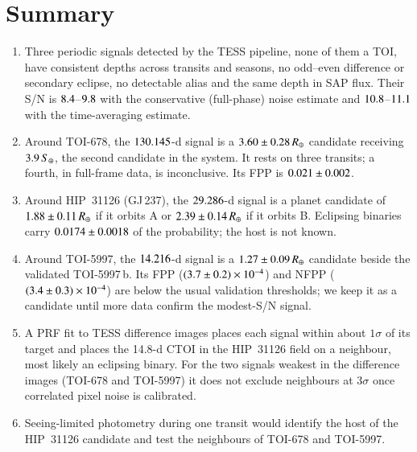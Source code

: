 \documentclass[twocolumn,numberedappendix,appendixfloats]{openjournal}
\newcommand{\rearth}{R_{\oplus}}
\begin{document}
\section{Summary}
\label{sec:summary}

\begin{enumerate}
\item Three periodic signals detected by the TESS pipeline, none of them
      a TOI, have consistent depths across transits and seasons, no odd--even
      difference or secondary eclipse, no detectable alias and the same depth
      in SAP flux. Their S/N is $8.4$--$9.8$ with the
      conservative (full-phase) noise estimate and $10.8$--$11.1$ with the
      time-averaging estimate.
\item Around TOI-678, the $130.145$-d signal is a $\RpTs\,\rearth$
      candidate receiving $3.9\,S_\oplus$, the second candidate in the
      system. It rests on three transits; a fourth, in full-frame data, is
      inconclusive. Its FPP is $0.021 \pm 0.002$.
\item Around HIP~31126 (GJ\,237), the $29.286$-d signal is a planet
      candidate of $\RpHp\,\rearth$ if it orbits A or $\RpHpB\,\rearth$ if it
      orbits B. Eclipsing binaries carry $0.0174 \pm 0.0018$ of the probability; the host
      is not known.
\item Around TOI-5997, the $14.216$-d signal is a $\RpTf\,\rearth$
      candidate beside the validated TOI-5997\,b. Its FPP ($(3.7 \pm 0.2)\times10^{-4}$) and NFPP
      ($(3.4 \pm 0.3)\times10^{-4}$) are below the usual validation thresholds; we keep it as a
      candidate until more data confirm the modest-S/N signal.
\item A PRF fit to TESS difference images places each signal within about
      $1\sigma$ of its target and places the 14.8-d CTOI in the HIP~31126 field
      on a neighbour, most likely an eclipsing binary. For the two signals
      weakest in the difference images (TOI-678 and TOI-5997) it does not
      exclude neighbours at $3\sigma$ once correlated pixel noise is
      calibrated.
\item Seeing-limited photometry during one transit would identify the host of
      the HIP~31126 candidate and test the neighbours of TOI-678 and TOI-5997.
\end{enumerate}
\end{document}

